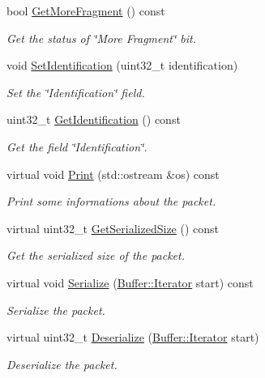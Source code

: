 \begin{DoxyCompactItemize}
bool \hyperlink{classns3_1_1Ipv6ExtensionFragmentHeader_a0a66a03d72906b5c5e507debdc07a8ac}{Get\+More\+Fragment} () const 
\begin{DoxyCompactList}\small\item\em Get the status of \char`\"{}\+More Fragment\char`\"{} bit. \end{DoxyCompactList}\item 
void \hyperlink{classns3_1_1Ipv6ExtensionFragmentHeader_a2fdb024d7f60496f8bdd5c75634397cf}{Set\+Identification} (uint32\+\_\+t identification)
\begin{DoxyCompactList}\small\item\em Set the \char`\"{}\+Identification\char`\"{} field. \end{DoxyCompactList}\item 
uint32\+\_\+t \hyperlink{classns3_1_1Ipv6ExtensionFragmentHeader_a1a9728c990b53f47b088f504650bda25}{Get\+Identification} () const 
\begin{DoxyCompactList}\small\item\em Get the field \char`\"{}\+Identification\char`\"{}. \end{DoxyCompactList}\item 
virtual void \hyperlink{classns3_1_1Ipv6ExtensionFragmentHeader_af3f14f693d3364f37ece0683c8324f89}{Print} (std\+::ostream \&os) const 
\begin{DoxyCompactList}\small\item\em Print some informations about the packet. \end{DoxyCompactList}\item 
virtual uint32\+\_\+t \hyperlink{classns3_1_1Ipv6ExtensionFragmentHeader_afe7e7be8a5b44ec8def1ac83a19c6696}{Get\+Serialized\+Size} () const 
\begin{DoxyCompactList}\small\item\em Get the serialized size of the packet. \end{DoxyCompactList}\item 
virtual void \hyperlink{classns3_1_1Ipv6ExtensionFragmentHeader_ac63d2e1a8fe9f7cdb3589c2677f5f9f6}{Serialize} (\hyperlink{classns3_1_1Buffer_1_1Iterator}{Buffer\+::\+Iterator} start) const 
\begin{DoxyCompactList}\small\item\em Serialize the packet. \end{DoxyCompactList}\item 
virtual uint32\+\_\+t \hyperlink{classns3_1_1Ipv6ExtensionFragmentHeader_ac665209cceae832687c23c0c664e5a5d}{Deserialize} (\hyperlink{classns3_1_1Buffer_1_1Iterator}{Buffer\+::\+Iterator} start)
\begin{DoxyCompactList}\small\item\em Deserialize the packet. \end{DoxyCompactList}\end{DoxyCompactItemize}

